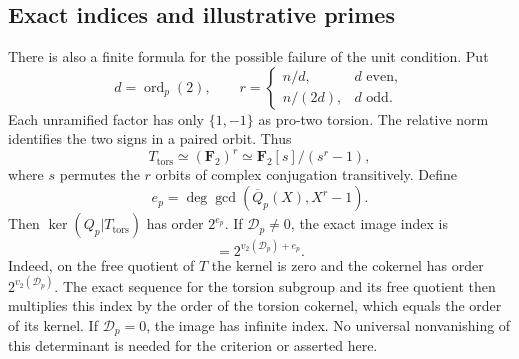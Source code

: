 \subsection{Exact indices and illustrative primes}

There is also a finite formula for the possible failure of the
unit condition. Put
\[
 d=\operatorname{ord}_p(2),\qquad
 r=\begin{cases}
       n/d,& d\text{ even},\\
       n/(2d),&d\text{ odd}.
    \end{cases}
\]
Each unramified factor has only \(\{1,-1\}\) as pro-two
torsion. The relative norm identifies the two signs in a paired
orbit. Thus
\begin{equation}
 T_{\mathrm{tors}}\simeq(\mathbf F_2)^r
              \simeq\mathbf F_2[s]/(s^r-1),              \label{eq:cm-type-13}
\end{equation}
where \(s\) permutes the \(r\) orbits of complex conjugation
transitively. Define
\[
 e_p=\deg\gcd(\overline Q_p(X),X^r-1).
\]
Then \(\ker(Q_p|T_{\mathrm{tors}})\) has order \(2^{e_p}\).
If \(\mathcal D_p\neq0\), the exact image index is
\begin{equation}
                  [T:Q_pT]=2^{v_2(\mathcal D_p)+e_p}.    \label{eq:cm-type-14}
\end{equation}
Indeed, on the free quotient of \(T\) the kernel is zero and
the cokernel has order \(2^{v_2(\mathcal D_p)}\). The exact
sequence for the torsion subgroup and its free quotient then
multiplies this index by the order of the torsion cokernel,
which equals the order of its kernel. If \(\mathcal D_p=0\),
the image has infinite index. No universal nonvanishing of this
determinant is needed for the criterion or asserted here.

